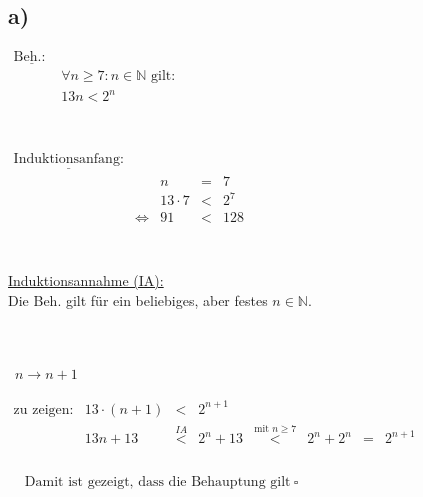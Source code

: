 \documentclass[a4paper]{scrartcl}
\newcommand{\qed}{\ \square}
\begin{document}
	\subsection{a)}
		\(		
		\begin{array}{llcl}
			\underline{\text{Beh.: }}& \\
				&\forall n\geq 7:n\in\mathbb{N}\text{ gilt:} \\
				&13n<2^n \\
		\end{array}
		\)\\ \\ \\
		\(
		\begin{array}{llrclcl}
			\underline{\text{Induktionsanfang:}}& \\
				&&n&=&7 \\
				&&13\cdot 7&<&2^7 \\
				&\Leftrightarrow &91&<&128 \\

		\end{array}
		\)\\ \\ \\
		\underline{Induktionsannahme (IA):}\\
		Die Beh. gilt für ein beliebiges, aber festes \(n\in\mathbb{N}\).\\ \\ \\
		\newpage
		\begin{flushleft}
			\underline{}\ \(n\rightarrow n+1\) \\
		\end{flushleft}
		\(
		\begin{array}{lrclclcl}
			\text{zu zeigen:} & 13\cdot (n+1)&<&2^{n+1} \\
			& 13n+13 &\overset{IA}{<}& 2^n+13 &\overset{\text{mit } n\geq 7}{<}& 2^n+2^n &=& 2^{n+1} \\
		\end{array}
		\)\\ \\ 
		\(
		\begin{array}{lcl}
			&\text{Damit ist gezeigt, dass die Behauptung gilt}\qed \\
		\end{array}
		\)
		
\end{document}

